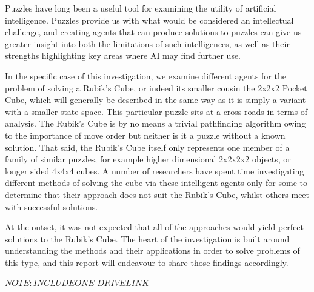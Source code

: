 \documentclass[UKenglish]{libraries/svproc}
\begin{document}
\hspace{8pt}

Puzzles have long been a useful tool for examining the utility of artificial intelligence. Puzzles provide us with what would be considered an intellectual challenge, and creating agents that can produce solutions to puzzles can give us greater insight into both the limitations of such intelligences, as well as their strengths highlighting key areas where AI may find further use.

In the specific case of this investigation, we examine different agents for the problem of solving a Rubik's Cube, or indeed its smaller cousin the 2x2x2 Pocket Cube, which will generally be described in the same way as it is simply a variant with a smaller state space. This particular puzzle sits at a cross-roads in terms of analysis. The Rubik's Cube is by no means a trivial pathfinding algorithm owing to the importance of move order but neither is it a puzzle without a known solution. That said, the Rubik's Cube itself only represents one member of a family of similar puzzles, for example higher dimensional 2x2x2x2 objects, or longer sided 4x4x4 cubes. A number of researchers have spent time investigating different methods of solving the cube via these intelligent agents only for some to determine that their approach does not suit the Rubik's Cube, whilst others meet with successful solutions.

At the outset, it was not expected that all of the approaches would yield perfect solutions to the Rubik's Cube. The heart of the investigation is built around understanding the methods and their applications in order to solve problems of this type, and this report will endeavour to share those findings accordingly. 

$NOTE: INCLUDE ONE\_DRIVE LINK$

\end{document}
